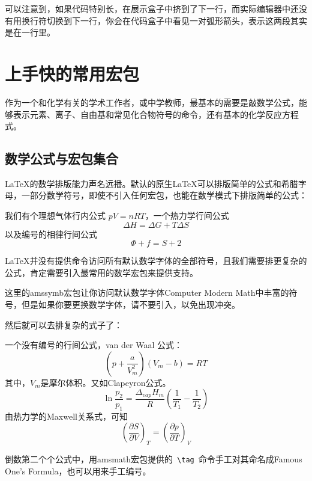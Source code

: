 \documentclass[a4paper,UTF8,zihao = -4]{ctexart} %
\begin{document}
\noindent 可以注意到，如果代码特别长，在展示盒子中挤到了下一行，而实际编辑器中还没有用换行符切换到下一行，你会在代码盒子中看见一对弧形箭头，表示这两段其实是在一行里。

\section{上手快的常用宏包}
\label{sec:elementaryUsage}

作为一个和化学有关的学术工作者，或中学教师，最基本的需要是敲数学公式，能够表示元素、离子、自由基和常见化合物符号的命令，还有基本的化学反应方程式。

\subsection{数学公式与\AmS{}宏包集合}
\label{sec:mathPkg}

\LaTeX{}的数学排版能力声名远播。默认的原生\LaTeX{}可以排版简单的公式和希腊字母，一部分数学符号，即使不引入任何宏包，也能在数学模式下排版简单的公式：


\begin{dispExample}
我们有个理想气体行内公式 $ pV = nRT $，一个热力学行间公式
\[
  \Delta H = \Delta G + T\Delta S
\]
以及编号的相律行间公式
\begin{equation}
  \Phi + f = S + 2
\end{equation}
\end{dispExample}

\LaTeX{}并没有提供命令访问所有默认数学字体的全部符号，且我们需要排更复杂的公式，肯定需要引入最常用的数学宏包来提供支持。
\begin{dispListing}
\usepackage{amsmath}
\usepackage{amssymb}
\end{dispListing}
这里的\textsf{amssymb}宏包让你访问默认数学字体Computer Modern Math中丰富的符号，但是如果你要更换数学字体，请不要引入，以免出现冲突。

然后就可以去排复杂的式子了：
\begin{dispExample}
一个没有编号的行间公式，van der Waal 公式：
\[
  \left( p + \dfrac{a}{V_m^2} \right)(V_m - b) = RT
\]
其中，$V_m$是摩尔体积。又如Clapeyron公式。
\begin{equation}
  \ln\dfrac{p_2}{p_1}=\dfrac{\Delta _{vap}H_m}{R}\left(\dfrac{1}{T_1} - \dfrac{1}{T_2}\right)   \tag{Famous One's Formula}
\end{equation}
由热力学的Maxwell关系式，可知
\begin{equation}
  \left(\dfrac{\partial S}{\partial V}\right)_T = \left(\dfrac{\partial p}{\partial T}\right)_V
\end{equation}
\end{dispExample}
倒数第二个个公式中，用\textsf{amsmath}宏包提供的~\verb|\tag|~命令手工对其命名成Famous One's Formula，也可以用来手工编号。
\end{document}
